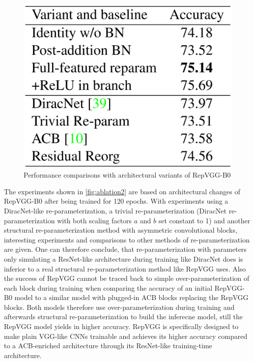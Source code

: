 \begin{figure}[t]
	\begin{center}
		\includegraphics[width=0.8\linewidth]{images/ablation2.PNG}
	\end{center}
	\caption{Performance comparisons with architectural variants of RepVGG-B0}
	\label{fig:ablation2}
\end{figure}

The experiments shown in \autoref{fig:ablation2} are based on architectural changes of RepVGG-B0 after being trained for 120 epochs. With experiments using a DiracNet-like re-parameterization, a trivial re-parameterization (DiracNet re-parameterization with both scaling factors $a$ and $b$ set constant to 1) and another structural re-parameterization method with asymmetric convolutional blocks, interesting experiments and comparisons to other methods of re-parameterization are given. One can therefore conclude, that re-parameterization with parameters only simulating a ResNet-like architecture during training like DiracNet does is inferior to a real structural re-parameterization method like RepVGG uses. Also the success of RepVGG cannot be traced back to simple over-parameterization of each block during training when comparing the accuracy of an initial RepVGG-B0 model to a similar model with plugged-in ACB blocks replacing the RepVGG blocks. Both models therefore use over-parameterization during training and afterwards structural re-parameterization to build the inferecne model, still the RepVGG model yields in higher accuracy. RepVGG is specifically designed to make plain VGG-like CNNs trainable and achieves its higher accuracy compared to a ACB-enriched architecture through its ResNet-like training-time architecture. 

